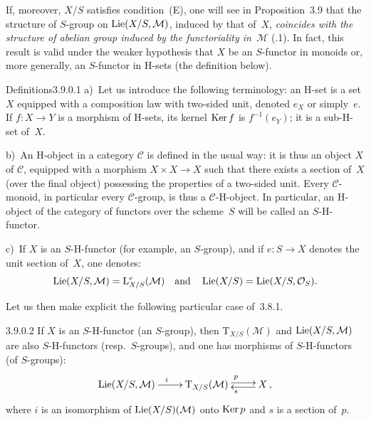 If, moreover, \(X/S\) satisfies condition~\textup{(E)}, one will see in
Proposition~3.9 that the structure of \(S\)-group on
\(\operatorname{Lie}(X/S,\mathcal{M})\), induced by that of~\(X\), \emph{coincides with the
structure of abelian group induced by the functoriality in~\(\mathcal{M}\)}
(.1). In fact, this result is valid under the weaker hypothesis that
\(X\) be an \(S\)-functor in monoids or, more generally, an \(S\)-functor in
H-sets (\cf the definition below).

\begin{enoncerm}{Definitions}{3.9.0.1}\label{II.3.9.0.1}
a)~Let us introduce the following terminology:%
{\renewcommand{\thefootnote}{(31)}}
an H-set is a set \(X\) equipped with a composition law with two-sided
unit, denoted \(e_{X}\) or simply~\(e\). If \(f\colon X\to Y\) is a morphism
of H-sets, its kernel \(\operatorname{Ker} f\) is \(f^{-1}(e_{Y})\); it is a
sub-H-set of~\(X\).

b)~An H-object in a category \(\mathcal{C}\) is defined in the usual way: it
is thus an object \(X\) of \(\mathcal{C}\), equipped with a morphism
\(X\times X\to X\) such that there exists a section of~\(X\) (over the final
object) possessing the properties of a two-sided unit. Every
\(\mathcal{C}\)-monoid, in particular every \(\mathcal{C}\)-group, is thus a
\(\mathcal{C}\)-H-object. In particular, an H-object of the category of
functors over the scheme~\(S\) will be called an \(S\)-H-functor.

c)~If \(X\) is an \(S\)-H-functor (for example, an \(S\)-group), and if
\(e\colon S\to X\) denotes the unit section of~\(X\), one denotes:
\[
\operatorname{Lie}(X/S,\mathcal{M})=\mathrm{L}^{e}_{X/S}(\mathcal{M})
\quad\text{and}\quad
\operatorname{Lie}(X/S)=\operatorname{Lie}(X/S,\mathcal{O}_S).
\]
\end{enoncerm}

Let us then make explicit the following particular case of~3.8.1.%
{\renewcommand{\thefootnote}{(32)}}

\begin{corollary}{3.9.0.2}\label{II.3.9.0.2}
If \(X\) is an \(S\)-H-functor (\resp an \(S\)-group), then
\(\mathrm{T}_{X/S}(\mathcal{M})\) and \(\operatorname{Lie}(X/S,\mathcal{M})\) are also
\(S\)-H-functors (resp.\ \(S\)-groups), and one has morphisms of
\(S\)-H-functors (\resp of \(S\)-groups):
\[
\xymatrix{
\Lie(X/S,\mathcal{M})\ar[r]^{i}
& \mathrm{T}_{X/S}(\mathcal{M})\ar@<0.5ex>[r]^{p}
& X\ar@<0.5ex>[l]^{s}\,,
}
\]
where \(i\) is an isomorphism of \(\operatorname{Lie}(X/S)(\mathcal{M})\) onto \(\operatorname{Ker} p\) and
\(s\) is a section of~\(p\).
\end{corollary}

